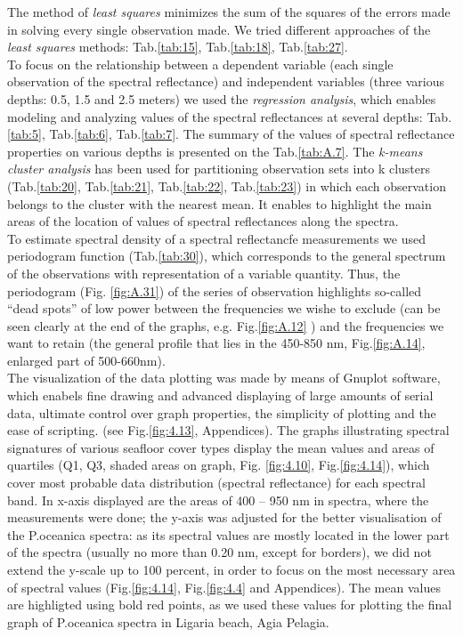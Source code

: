 \documentclass[10pt, a4paper]{article}
\begin{document}
The method of \textit{least squares} minimizes the sum of the squares of the errors made in solving every single observation made. We tried different approaches of the \textit{least squares} methods: Tab.\ref{tab:15}, Tab.\ref{tab:18}, Tab.\ref{tab:27}.\\
To focus on the relationship between a dependent variable (each single observation of the spectral reflectance) and independent variables (three various depths: 0.5, 1.5 and 2.5 meters) we used the \textit{regression analysis}, which enables modeling and analyzing values of the spectral reflectances at several depths: Tab.\ref{tab:5}, Tab.\ref{tab:6}, Tab.\ref{tab:7}. 
The summary of the values of spectral reflectance properties on various depths is presented on the Tab.\ref{tab:A.7}.
The \textit{k-means cluster analysis} has been used for partitioning observation sets into k clusters (Tab.\ref{tab:20}, Tab.\ref{tab:21}, Tab.\ref{tab:22}, Tab.\ref{tab:23}) in which each observation belongs to the cluster with the nearest mean.
It enables to highlight the main areas of the location of values of spectral reflectances along the spectra.\\
To estimate spectral density of a spectral reflectancfe measurements we used periodogram function (Tab.\ref{tab:30}), 
which corresponds to the general spectrum of the observations with representation of a variable quantity.  
Thus, the periodogram (Fig. \ref{fig:A.31}) of the series of observation highlights so-called “dead spots” of low power between the frequencies we wishe to
exclude (can be seen clearly at the end of the graphs, e.g. Fig.\ref{fig:A.12} ) 
and the frequencies we want to retain (the general profile that lies in the 450-850 nm, Fig.\ref{fig:A.14}, enlarged part of 500-660nm).\\
The visualization of the data plotting was made by means of Gnuplot software, which enabels fine
drawing and advanced displaying of large amounts of serial data, ultimate control over graph properties, 
the simplicity of plotting and the ease of scripting. (see Fig.\ref{fig:4.13}, Appendices).
The graphs illustrating spectral signatures of various seafloor cover types display the mean values and
areas of quartiles (Q1, Q3, shaded areas on graph, Fig. \ref{fig:4.10}, Fig.\ref{fig:4.14}), which cover most probable data distribution
(spectral reflectance) for each spectral band. In x-axis displayed are the areas of 400 – 950 nm in
spectra, where the measurements were done; the y-axis was adjusted for the better visualisation of the
P.oceanica spectra: as its spectral values are mostly located in the lower part of the spectra (usually no
more than 0.20 nm, except for borders), we did not extend the y-scale up to 100 percent, in order to
focus on the most necessary area of spectral values (Fig.\ref{fig:4.14}, Fig.\ref{fig:4.4} and Appendices). The mean values are
highligted using bold red points, as we used these values for plotting the final graph of P.oceanica spectra in
Ligaria beach, Agia Pelagia.
\end{document}
